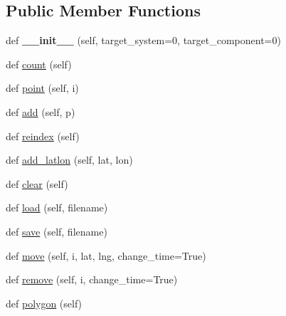 \subsection*{Public Member Functions}
\begin{DoxyCompactItemize}
\item 
\mbox{\label{classpymavlink_1_1mavwp_1_1MAVFenceLoader_ad2c36ce95b96d8ccb0d182254b64a75a}} 
def {\bfseries \+\_\+\+\_\+init\+\_\+\+\_\+} (self, target\+\_\+system=0, target\+\_\+component=0)
\item 
def \hyperlink{classpymavlink_1_1mavwp_1_1MAVFenceLoader_ad1ba7f8d238b1ff9fba27f1ac45a4174}{count} (self)
\item 
def \hyperlink{classpymavlink_1_1mavwp_1_1MAVFenceLoader_adf811be126be216f243c8c3e5410095b}{point} (self, i)
\item 
def \hyperlink{classpymavlink_1_1mavwp_1_1MAVFenceLoader_a58e43bc724a67d155e5746e7abf3d31e}{add} (self, p)
\item 
def \hyperlink{classpymavlink_1_1mavwp_1_1MAVFenceLoader_aa556e6ef7a6379e42ec797f3b2f376b1}{reindex} (self)
\item 
def \hyperlink{classpymavlink_1_1mavwp_1_1MAVFenceLoader_adfb4b572f7ecfa4bee52c3f62e42915f}{add\+\_\+latlon} (self, lat, lon)
\item 
def \hyperlink{classpymavlink_1_1mavwp_1_1MAVFenceLoader_a892ccc569e1dcae04f5b9a9219849c0b}{clear} (self)
\item 
def \hyperlink{classpymavlink_1_1mavwp_1_1MAVFenceLoader_a31e6f593846fa95c782d1567215cb141}{load} (self, filename)
\item 
def \hyperlink{classpymavlink_1_1mavwp_1_1MAVFenceLoader_a34fdb2bc4e79b7649714adb5d0bfd667}{save} (self, filename)
\item 
def \hyperlink{classpymavlink_1_1mavwp_1_1MAVFenceLoader_a3a8c6237c42535dd031f28da0a9139ea}{move} (self, i, lat, lng, change\+\_\+time=True)
\item 
def \hyperlink{classpymavlink_1_1mavwp_1_1MAVFenceLoader_a7c1a07eaf7b428d33bc963335ae4d5bd}{remove} (self, i, change\+\_\+time=True)
\item 
def \hyperlink{classpymavlink_1_1mavwp_1_1MAVFenceLoader_a9c0857c45d7a72d6e9dfd80246816f8e}{polygon} (self)
\end{DoxyCompactItemize}
